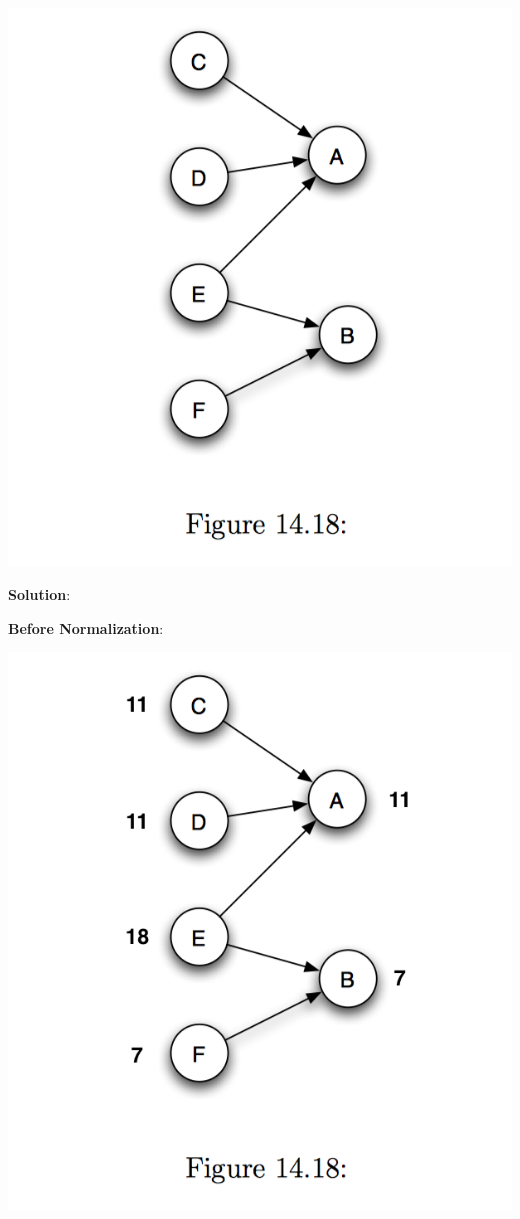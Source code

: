 \documentclass[a4paper]{article}
\begin{document}
\begin{center}
  \includegraphics[scale=0.5]{fig3.png}
\end{center}

\textbf{Solution}:

\textbf{Before Normalization}:

\begin{center}
  \includegraphics[scale=0.5]{fig3-prev.png}
\end{center}
\end{document}
